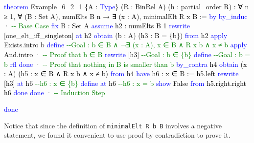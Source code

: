 \documentclass[
  letterpaper,
  DIV=11,
  numbers=noendperiod]{scrreprt}
\makeatletter
\newenvironment{Shaded}{\begin{snugshade}}{\end{snugshade}}
\newcommand{\CommentTok}[1]{\textcolor[rgb]{0.37,0.37,0.37}{#1}}
\newcommand{\KeywordTok}[1]{\textcolor[rgb]{0.00,0.23,0.31}{#1}}
\newcommand{\NormalTok}[1]{\textcolor[rgb]{0.00,0.23,0.31}{#1}}
\newcommand{\SpecialCharTok}[1]{\textcolor[rgb]{0.37,0.37,0.37}{#1}}
\newcommand{\WarningTok}[1]{\textcolor[rgb]{0.37,0.37,0.37}{\textit{#1}}}
\def\redsquiggly{\bgroup \markoverwith{\textcolor{red}{\lower3.5\p@\hbox{\sixly \char58}}}\ULon}
\renewcommand{\NormalTok}[1]{\textcolor[HTML]{000000}{#1}}
\renewcommand{\KeywordTok}[1]{\textcolor[HTML]{0000FF}{#1}}
\renewcommand{\SpecialCharTok}[1]{}
\renewcommand{\WarningTok}[1]{\redsquiggly{\textcolor[HTML]{0000FF}{#1}}}
\renewcommand{\CommentTok}[1]{\textcolor[HTML]{008000}{#1}}
\theoremstyle{remark}
\makeatother
\begin{document}
\begin{Shaded}
\begin{Highlighting}[]
\KeywordTok{theorem}\NormalTok{ Example\_6\_2\_1 \{A : }\KeywordTok{Type}\NormalTok{\} (R : BinRel A) (h : partial\_order R) :}
\NormalTok{    ∀ n ≥ 1, ∀ (B : Set A), numElts B n →}
\NormalTok{      ∃ (x : A), minimalElt R x B := }\KeywordTok{by}
  \KeywordTok{by\_induc}
\NormalTok{  · }\CommentTok{{-}{-} Base Case}
    \KeywordTok{fix}\NormalTok{ B : Set A}
    \KeywordTok{assume}\NormalTok{ h2 : numElts B 1}
    \KeywordTok{rewrite}\NormalTok{ [one\_elt\_iff\_singleton] }\KeywordTok{at}\NormalTok{ h2}
    \KeywordTok{obtain}\NormalTok{ (b : A) (h3 : B = \{b\}) }\KeywordTok{from}\NormalTok{ h2}
    \KeywordTok{apply}\NormalTok{ Exists.intro b}
    \KeywordTok{define}         \CommentTok{{-}{-}Goal : b ∈ B ∧ ¬∃ (x : A), x ∈ B ∧ R x b ∧ x ≠ b}
    \KeywordTok{apply}\NormalTok{ And.intro}
\NormalTok{    · }\CommentTok{{-}{-} Proof that b ∈ B}
      \KeywordTok{rewrite}\NormalTok{ [h3]    }\CommentTok{{-}{-}Goal : b ∈ \{b\}}
      \KeywordTok{define}          \CommentTok{{-}{-}Goal : b = b}
      \KeywordTok{rfl}
      \KeywordTok{done}
\NormalTok{    · }\CommentTok{{-}{-} Proof that nothing in B is smaller than b}
      \KeywordTok{by\_contra}\NormalTok{ h4}
      \KeywordTok{obtain}\NormalTok{ (x : A) (h5 : x ∈ B ∧ R x b ∧ x ≠ b) }\KeywordTok{from}\NormalTok{ h4}
      \KeywordTok{have}\NormalTok{ h6 : x ∈ B := h5.left}
      \KeywordTok{rewrite}\NormalTok{ [h3] }\KeywordTok{at}\NormalTok{ h6   }\CommentTok{{-}{-}h6 : x ∈ \{b\}}
      \KeywordTok{define} \KeywordTok{at}\NormalTok{ h6         }\CommentTok{{-}{-}h6 : x = b}
      \KeywordTok{show}\NormalTok{ False }\KeywordTok{from}\NormalTok{ h5.right.right h6}
      \KeywordTok{done}
    \KeywordTok{done}
\NormalTok{  · }\CommentTok{{-}{-} Induction Step}

    \SpecialCharTok{**}\WarningTok{done}\SpecialCharTok{::}
  \KeywordTok{done}
\end{Highlighting}
\end{Shaded}

Notice that since the definition of \texttt{minimalElt\ R\ b\ B}
involves a negative statement, we found it convenient to use proof by
contradiction to prove it.
\end{document}
